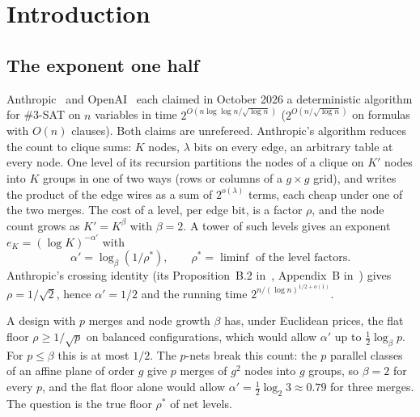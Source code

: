 \documentclass[10pt]{amsart}
\theoremstyle{plain}
\theoremstyle{definition}
\theoremstyle{remark}
\numberwithin{equation}{section}
\begin{document}
\maketitle

\section{Introduction}\label{sec:intro}

\subsection{The exponent one half}
Anthropic~\cite{AnthropicETH} and OpenAI~\cite{OpenAIETH} each claimed in October 2026 a
deterministic algorithm for \#3-SAT on $n$ variables in time $2^{O(n\log\log n/\sqrt{\log n})}$
($2^{O(n/\sqrt{\log n})}$ on formulas with $O(n)$ clauses). Both claims are unrefereed. Anthropic's algorithm reduces the count to clique sums: $K$ nodes, $\lambda$ bits
on every edge, an arbitrary table at every node. One level of its recursion partitions the nodes of
a clique on $K'$ nodes into $K$ groups in one of two ways (rows or columns of a $g\times g$ grid), and
writes the product of the edge wires as a sum of $2^{o(\lambda)}$ terms, each cheap under one of the
two merges. The cost of a level, per edge bit, is a factor $\rho$, and the node count grows as
$K'=K^{\beta}$ with $\beta=2$. A tower of such levels gives an exponent $e_K=(\log K)^{-\alpha'}$
with
\begin{equation}\label{eq:alpha}
\alpha'=\log_\beta(1/\rho^*),\qquad \rho^*=\liminf\text{ of the level factors}.
\end{equation}
Anthropic's crossing identity (its Proposition~B.2 in~\cite{AnthropicVP}, Appendix~B
in~\cite{AnthropicETH}) gives $\rho=1/\sqrt2$, hence $\alpha'=1/2$ and the running time
$2^{n/(\log n)^{1/2+o(1)}}$.

A design with $p$ merges and node growth $\beta$ has, under Euclidean prices, the flat floor
$\rho\ge1/\sqrt p$ on balanced configurations, which would allow $\alpha'$ up to
$\tfrac12\log_\beta p$. For $p\le\beta$ this is at most $1/2$. The $p$-nets break this count: the
$p$ parallel classes of an affine plane of order $g$ give $p$ merges of $g^2$ nodes into $g$ groups,
so $\beta=2$ for every $p$, and the flat floor alone would allow $\alpha'=\tfrac12\log_2 3\approx0.79$
for three merges. The question is the true floor $\rho^*$ of net levels.
\end{document}
